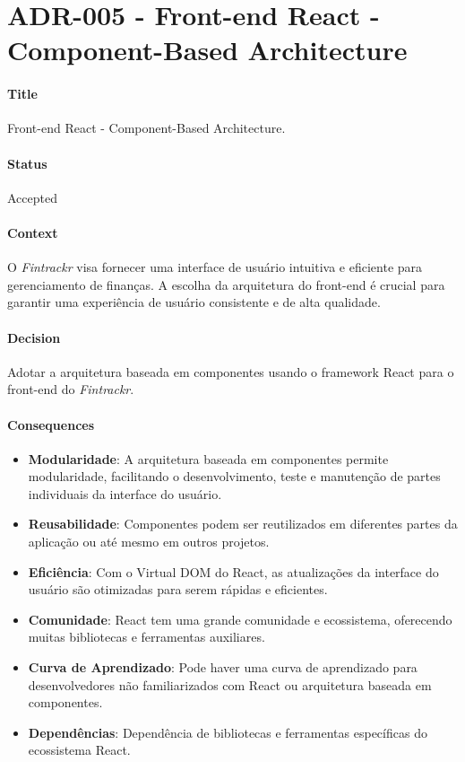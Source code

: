 
\chapter{ADR-005 - Front-end React - Component-Based Architecture}
\label{apendiceADR005}

\subsubsection*{Title}
Front-end React - Component-Based Architecture.

\subsubsection*{Status}
Accepted

\subsubsection*{Context}
O \textit{Fintrackr} visa fornecer uma interface de usuário intuitiva e eficiente para gerenciamento de finanças. A escolha da arquitetura do front-end é crucial para garantir uma experiência de usuário consistente e de alta qualidade.

\subsubsection*{Decision}
Adotar a arquitetura baseada em componentes usando o framework React para o front-end do \textit{Fintrackr}.

\subsubsection*{Consequences}
\begin{itemize}
	\item \textbf{Modularidade}: A arquitetura baseada em componentes permite modularidade, facilitando o desenvolvimento, teste e manutenção de partes individuais da interface do usuário.
	\item \textbf{Reusabilidade}: Componentes podem ser reutilizados em diferentes partes da aplicação ou até mesmo em outros projetos.
	\item \textbf{Eficiência}: Com o Virtual DOM do React, as atualizações da interface do usuário são otimizadas para serem rápidas e eficientes.
	\item \textbf{Comunidade}: React tem uma grande comunidade e ecossistema, oferecendo muitas bibliotecas e ferramentas auxiliares.
	\item \textbf{Curva de Aprendizado}: Pode haver uma curva de aprendizado para desenvolvedores não familiarizados com React ou arquitetura baseada em componentes.
	\item \textbf{Dependências}: Dependência de bibliotecas e ferramentas específicas do ecossistema React.
\end{itemize}
